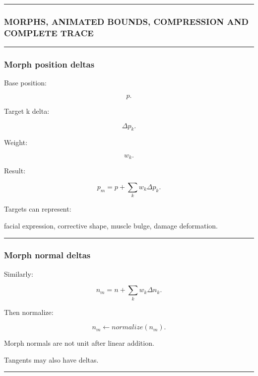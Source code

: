 \begin{center}\rule{0.5\linewidth}{0.5pt}\end{center}

\subsubsection{MORPHS, ANIMATED BOUNDS, COMPRESSION AND COMPLETE TRACE}\label{morphs-animated-bounds-compression-and-complete-trace}

\begin{center}\rule{0.5\linewidth}{0.5pt}\end{center}

\subsubsection{Morph position deltas}\label{morph-position-deltas}

Base position:

\[
p.
\]

Target k delta:

\[
\Delta p_k.
\]

Weight:

\[
w_k.
\]

Result:

\[
\boxed{
p_m
=
p+
\sum_kw_k\Delta p_k.
}
\]

Targets can represent:

facial expression, corrective shape, muscle bulge, damage deformation.

\begin{center}\rule{0.5\linewidth}{0.5pt}\end{center}

\subsubsection{Morph normal deltas}\label{morph-normal-deltas}

Similarly:

\[
n_m=
n+
\sum_kw_k\Delta n_k.
\]

Then normalize:

\[
\boxed{
n_m\leftarrow
normalize(n_m).
}
\]

Morph normals are not unit after linear addition.

Tangents may also have deltas.

\begin{center}\rule{0.5\linewidth}{0.5pt}\end{center}

